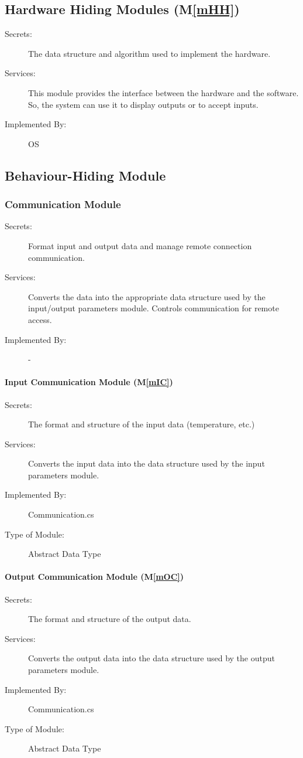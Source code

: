 \documentclass[12pt, titlepage]{article}
\newcommand{\mref}[1]{M\ref{#1}}
\begin{document}
\subsection{Hardware Hiding Modules (\mref{mHH})}

\begin{description}
\item[Secrets:]The data structure and algorithm used to implement the hardware.
\item[Services:]This module provides the interface between the hardware and the
  software. So, the system can use it to display outputs or to accept inputs.
\item[Implemented By:] OS
\end{description}

\subsection{Behaviour-Hiding Module}

\subsubsection{Communication Module}
\begin{description}
  \item[Secrets:] Format input and output data and manage remote connection communication.
  \item[Services:]Converts the data into the appropriate data structure used by the
    input/output parameters module. Controls communication for remote access. 
  \item[Implemented By:] -
  \end{description}

\paragraph{Input Communication Module (\mref{mIC})}
\begin{description}
\item[Secrets:]The format and structure of the input data (temperature, etc.)
\item[Services:]Converts the input data into the data structure used by the
  input parameters module.
\item[Implemented By:] Communication.cs
\item[Type of Module:] Abstract Data Type
\end{description}

\paragraph{Output Communication Module (\mref{mOC})}
\begin{description}
\item[Secrets:]The format and structure of the output data.
\item[Services:]Converts the output data into the data structure used by the output parameters module. 
\item[Implemented By:] Communication.cs
\item[Type of Module:] Abstract Data Type
\end{description}
\end{document}
